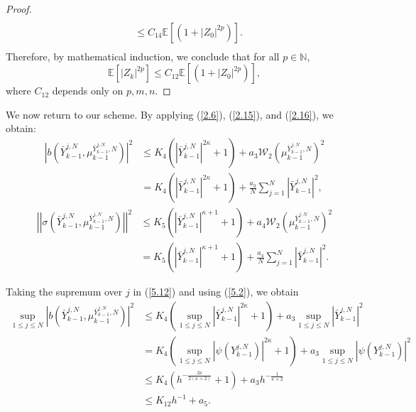 \documentclass[12pt]{article}
\numberwithin{equation}{section}
\begin{document}
\begin{proof}
\begin{equation}
\begin{aligned}
\\
&\leq C_{14}\mathbb{E} \left[ \left( 1+\left| Z_0 \right|^{2p}\right) \right].\\
\end{aligned}
\end{equation}
Therefore, by mathematical induction, we conclude that for all $p \in \mathbb{N}$,
\begin{equation}\tag{5.59}\label{5.11}
\mathbb{E}\left[\left|Z_k\right|^{2 p}\right] \leq C_{12}\mathbb{E}\left[\left(1+\left|Z_0\right|^{2 p}\right)\right],
\end{equation}
where $C_{12}$ depends only on $p, m, n$.
\end{proof}

We now return to our scheme. By applying (\ref{2.6}), (\ref{2.15}), and (\ref{2.16}), we obtain:
\begin{equation}\tag{5.60}\label{5.12}
\begin{aligned}
 \left|b\left(\bar{Y}^{j,N}_{k-1},\mu^{\bar{Y}^{j,N}_{k-1},N}_{k-1}\right)\right|^2&\leq K_4\left( \left|\bar{Y}^{j,N}_{k-1}\right|^{2\kappa}+1 \right) +a_3\mathcal{W}_2\left(\mu^{\bar{Y}^{j,N}_{k-1},N}_{k-1}\right) ^2 \\
&= K_4\left( \left|\bar{Y}^{j,N}_{k-1}\right|^{2\kappa}+1 \right) +\tfrac{a_3}{N}\sum_{j=1}^N{\left|\bar{Y}^{j,N}_{k-1}\right|^2},
\end{aligned}
\end{equation}
\begin{equation}\tag{5.61}\label{5.13}
\begin{aligned}
\left|\left| \sigma\left(\bar{Y}^{j,N}_{k-1},\mu^{\bar{Y}^{j,N}_{k-1},N}_{k-1}\right) \right| \right|^2&\leq K_5\left( \left|\bar{Y}^{j,N}_{k-1}\right|^{\kappa+1}+1 \right) +a_4\mathcal{W}_2\left(\mu^{\bar{Y}^{j,N}_{k-1},N}_{k-1}\right) ^2 \\
&= K_5\left( \left|\bar{Y}^{j,N}_{k-1}\right|^{\kappa+1}+1 \right) +\tfrac{a_4}{N}\sum_{j=1}^N{\left|\bar{Y}^{j,N}_{k-1}\right|^2}.
\end{aligned}
\end{equation}

Taking the supremum over $ j $ in (\ref{5.12}) and using (\ref{5.2}), we obtain
\begin{equation}\tag{5.62}\label{5.14}
\begin{aligned}
\underset{1\leqslant j\leqslant N}{\sup}\left|b\left(\bar{Y}^{j,N}_{k-1},\mu^{\bar{Y}^{j,N}_{k-1},N}_{k-1}\right)\right|^2
&\leq K_4\left(\underset{1\leqslant j\leqslant N}{\sup} \left|\bar{Y}^{j,N}_{k-1}\right|^{2\kappa}+1 \right) +a_3\underset{1\leqslant j\leqslant N}{\sup}\left|\bar{Y}^{j,N}_{k-1}\right|^2\\
&= K_4\left(\underset{1\leqslant j\leqslant N}{\sup}\left|\psi \left(Y_{k-1}^{j,N}\right)\right|^{2\kappa}+1 \right) +a_3\underset{1\leqslant j\leqslant N}{\sup}\left|\psi \left(Y_{k-1}^{j,N}\right)\right|^2\\
&\leq K_4\left(h^{-\frac{2\kappa}{2\left( \kappa +2 \right)}}+1\right)+a_3h^{-\frac{1}{ \kappa +2 }}\\
&\leq K_{12} h^{-1}+a_5.
\end{aligned}
\end{equation}
\end{document}

